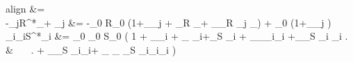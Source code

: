 \documentclass[12pt, titlepage]{report}
\begin{document}
	 \begin{empheq}[left=\empheqlbrace]{align}
	  &=  \\
	 -\gamma_{j\mu}R^*_\mu + \alpha_{\mu j} &= -\gamma_0 R_0 \left(1+\epsilon_\gamma \tilde{\gamma}_{j\mu} + \epsilon_R  _\mu + \epsilon_\gamma \epsilon_R  \tilde{\gamma}_{j\mu} _\mu\right) + \alpha_0 \left(1+\epsilon_\alpha \tilde{\alpha}_{\mu j}  \right) \\
	 \sigma_{i\nu}\gamma_{i\nu}S^*_i &= \sigma_0 \gamma_0 S_0 \left( 1 + \epsilon_\sigma \tilde{\sigma}_{i\nu} + \epsilon_{\gamma}  \tilde{\gamma}_{i\nu}+\epsilon_S  _i + \epsilon_\sigma \epsilon_\gamma  \tilde{\sigma}_{i\nu}\tilde{\gamma}_{i\nu}  +\epsilon_\sigma \epsilon_S  \tilde{\sigma}_{i\nu} _i  \right. \nonumber \\
	  & \ \ \  \left. + \epsilon_\gamma \epsilon_S  \tilde{\gamma}_{i\nu}_i+ \epsilon_{\sigma} \epsilon_{\gamma} \epsilon_{S}  \tilde{\sigma}_{i\nu}\tilde{\gamma}_{i\nu}_i \right)
	 \end{empheq}
\end{document}
